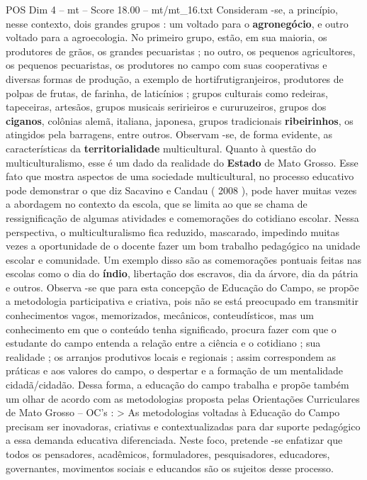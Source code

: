\begin{textsample}{POS Dim 4 – mt – Score 18.00 – mt/mt\_16.txt}
Consideram -se, a princípio, nesse contexto, dois grandes grupos : um voltado para o \textbf{agronegócio}, e outro voltado para a agroecologia.
No primeiro grupo, estão, em sua maioria, os produtores de grãos, os grandes pecuaristas ; no outro, os pequenos agricultores, os pequenos pecuaristas, os produtores no campo com suas cooperativas e diversas formas de produção, a exemplo de hortifrutigranjeiros, produtores de polpas de frutas, de farinha, de laticínios ; grupos culturais como redeiras, tapeceiras, artesãos, grupos musicais seririeiros e cururuzeiros, grupos dos \textbf{ciganos}, colônias alemã, italiana, japonesa, grupos tradicionais \textbf{ribeirinhos}, os atingidos pela barragens, entre outros.
Observam -se, de forma evidente, as características da \textbf{territorialidade} multicultural.
Quanto à questão do multiculturalismo, esse é um dado da realidade do \textbf{Estado} de Mato Grosso.
Esse fato que mostra aspectos de uma sociedade multicultural, no processo educativo pode demonstrar o que diz Sacavino e Candau ( 2008 ), pode haver muitas vezes a abordagem no contexto da escola, que se limita ao que se chama de ressignificação de algumas atividades e comemorações do cotidiano escolar.
Nessa perspectiva, o multiculturalismo fica reduzido, mascarado, impedindo muitas vezes a oportunidade de o docente fazer um bom trabalho pedagógico na unidade escolar e comunidade.
Um exemplo disso são as comemorações pontuais feitas nas escolas como o dia do \textbf{índio}, libertação dos escravos, dia da árvore, dia da pátria e outros.
Observa -se que para esta concepção de Educação do Campo, se propõe a metodologia participativa e criativa, pois não se está preocupado em transmitir conhecimentos vagos, memorizados, mecânicos, conteudísticos, mas um conhecimento em que o conteúdo tenha significado, procura fazer com que o estudante do campo entenda a relação entre a ciência e o cotidiano ; sua realidade ; os arranjos produtivos locais e regionais ; assim correspondem as práticas e aos valores do campo, o despertar e a formação de um mentalidade cidadã/cidadão.
Dessa forma, a educação do campo trabalha e propõe também um olhar de acordo com as metodologias proposta pelas Orientações Curriculares de Mato Grosso – OC’s : > As metodologias voltadas à Educação do Campo precisam ser inovadoras, criativas e contextualizadas para dar suporte pedagógico a essa demanda educativa diferenciada.
Neste foco, pretende -se enfatizar que todos os pensadores, acadêmicos, formuladores, pesquisadores, educadores, governantes, movimentos sociais e educandos são os sujeitos desse processo.

\end{textsample}

